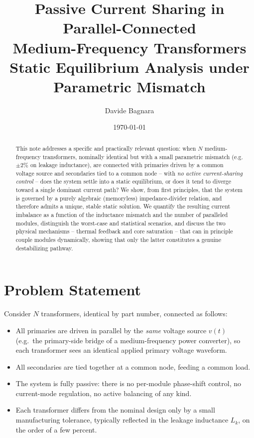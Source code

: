 \documentclass[11pt,a4paper]{article}
\title{Passive Current Sharing in Parallel-Connected\\ Medium-Frequency Transformers\\
\large Static Equilibrium Analysis under Parametric Mismatch}
\author{Davide Bagnara}
\date{\today}
\begin{document}
\maketitle

\begin{abstract}
This note addresses a specific and practically relevant question: when $N$ medium-frequency transformers, nominally identical but with a small parametric mismatch (e.g. $\pm 2\%$ on leakage inductance), are connected with primaries driven by a common voltage source and secondaries tied to a common node -- with \emph{no active current-sharing control} -- does the system settle into a static equilibrium, or does it tend to diverge toward a single dominant current path? We show, from first principles, that the system is governed by a purely algebraic (memoryless) impedance-divider relation, and therefore admits a unique, stable static solution. We quantify the resulting current imbalance as a function of the inductance mismatch and the number of paralleled modules, distinguish the worst-case and statistical scenarios, and discuss the two physical mechanisms -- thermal feedback and core saturation -- that can in principle couple modules dynamically, showing that only the latter constitutes a genuine destabilizing pathway.
\end{abstract}

\section{Problem Statement}

Consider $N$ transformers, identical by part number, connected as follows:
\begin{itemize}
  \item All primaries are driven in parallel by the \emph{same} voltage source $v(t)$ (e.g.\ the primary-side bridge of a medium-frequency power converter), so each transformer sees an identical applied primary voltage waveform.
  \item All secondaries are tied together at a common node, feeding a common load.
  \item The system is fully passive: there is no per-module phase-shift control, no current-mode regulation, no active balancing of any kind.
  \item Each transformer differs from the nominal design only by a small manufacturing tolerance, typically reflected in the leakage inductance $L_k$, on the order of a few percent.
\end{itemize}
\end{document}

